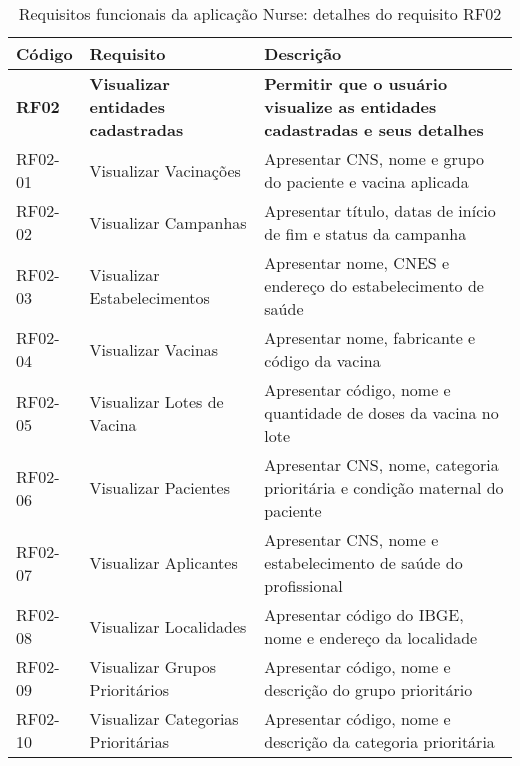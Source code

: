 \begin{table}[ht!]
  \centering
  {
  \begin{tabularx}{\textwidth}{
    | >{\centering\arraybackslash}m{} 
    | >{\centering\arraybackslash}m{} 
    | >{\raggedright\arraybackslash}X | }
    \hline
    \rowcolor{green!100}
    \textbf{Código} & \textbf{Requisito} & \textbf{Descrição} \\ \hline \hline
    \textbf{RF02}  &  \textbf{Visualizar entidades cadastradas} & \textbf{Permitir que o usuário visualize as entidades cadastradas e seus detalhes}  \\ \hline \hline
    RF02-01 & Visualizar Vacinações               & Apresentar CNS, nome e grupo do paciente e vacina aplicada \\ \hline
    RF02-02 & Visualizar Campanhas                & Apresentar título, datas de início de fim e status da campanha \\ \hline
    RF02-03 & Visualizar Estabelecimentos         & Apresentar nome, CNES e endereço do estabelecimento de saúde \\ \hline
    RF02-04 & Visualizar Vacinas                  & Apresentar nome, fabricante e código da vacina \\ \hline
    RF02-05 & Visualizar Lotes de Vacina          & Apresentar código, nome e quantidade de doses da vacina no lote \\ \hline
    RF02-06 & Visualizar Pacientes                & Apresentar CNS, nome, categoria prioritária e condição maternal do paciente \\ \hline
    RF02-07 & Visualizar Aplicantes               & Apresentar CNS, nome e estabelecimento de saúde do profissional \\ \hline
    RF02-08 & Visualizar Localidades              & Apresentar código do IBGE, nome e endereço da localidade \\ \hline
    RF02-09 & Visualizar Grupos Prioritários      & Apresentar código, nome e descrição do grupo prioritário \\ \hline
    RF02-10 & Visualizar Categorias Prioritárias  & Apresentar código, nome e descrição da categoria prioritária \\ \hline
  \end{tabularx}}
\caption{Requisitos funcionais da aplicação Nurse: detalhes do requisito RF02}
\label{tab:rf02_detalhe}
\end{table}


